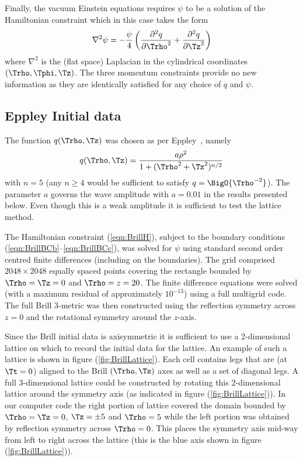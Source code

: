 \documentclass[a4paper,12pt]{article}
\numberwithin{equation}{section}
\begin{document}
Finally, the vacuum Einstein equations requires $\psi$ to be a solution of the
Hamiltonian constraint which in this case takes the form
\begin{align}
   \label{eqn:BrillH}
   \nabla^2 \psi = - \frac{\psi}{4}\left( \frac{\partial^2 q}{\partial\Trho^2}
                                         +\frac{\partial^2 q}{\partial\Tz^2}\right)
\end{align}
where $\nabla^2$ is the (flat space) Laplacian in the cylindrical coordinates
$(\Trho,\Tphi,\Tz)$. The three momentum constraints provide no new information as they are
identically satisfied for any choice of $q$ and $\psi$.

\subsection{Eppley Initial data}
\label{sec:BrillInitialData}
The function $q(\Trho,\Tz)$ was chosen as per Eppley~\cite{eppley:1977-01}, namely
\begin{align}
   q(\Trho,\Tz) = \frac{a \rho^2}{1+(\Trho^2+\Tz^2)^{n/2}}
\end{align}
with $n=5$ (any $n\ge4$ would be sufficient to satisfy $q=\BigO{\Trho^{-2}}$). The parameter
$a$ governs the wave amplitude with $a=0.01$ in the results presented below. Even though
this is a weak amplitude it is sufficient to test the lattice method.

The Hamiltonian constraint (\ref{eqn:BrillH}), subject to the boundary conditions
(\ref{eqn:BrillBCb}--\ref{eqn:BrillBCc}), was solved for $\psi$ using standard second order
centred finite differences (including on the boundaries). The grid comprised
$2048\times2048$ equally spaced points covering the rectangle bounded by $\Trho=\Tz=0$ and
$\Trho=z=20$. The finite difference equations were solved (with a maximum residual of
approximately $10^{-13}$) using a full multigrid code. The full Brill 3-metric was then
constructed using the reflection symmetry across $z=0$ and the rotational symmetry around the
$z$-axis.

Since the Brill initial data is axisymmetric it is sufficient to use a 2-dimensional lattice
on which to record the initial data for the lattice. An example of such a lattice is shown in
figure (\ref{fig:BrillLattice}). Each cell contains legs that are (at $\Tt=0$) aligned to
the Brill $(\Trho,\Tz)$ axes as well as a set of diagonal legs. A full 3-dimensional lattice
could be constructed by rotating this 2-dimensional lattice around the symmetry axis (as
indicated in figure (\ref{fig:BrillLattice})). In our computer code the right portion of
lattice covered the domain bounded by $\Trho=\Tz=0$, $\Tz=\pm5$ and $\Trho=5$ while the left
portion was obtained by reflection symmetry across $\Trho=0$. This places the symmetry axis
mid-way from left to right across the lattice (this is the blue axis shown in figure
(\ref{fig:BrillLattice})).
\end{document}
